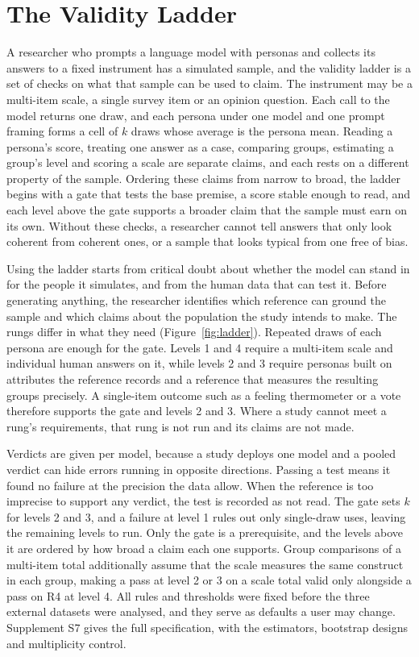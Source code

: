 
\section{The Validity Ladder}
\label{sec:ladder}

A researcher who prompts a language model with personas and collects its answers to a fixed instrument has a simulated sample, and the validity ladder is a set of checks on what that sample can be used to claim.
The instrument may be a multi-item scale, a single survey item or an opinion question.
Each call to the model returns one draw, and each persona under one model and one prompt framing forms a cell of $k$ draws whose average is the persona mean.
Reading a persona's score, treating one answer as a case, comparing groups, estimating a group's level and scoring a scale are separate claims, and each rests on a different property of the sample.
Ordering these claims from narrow to broad, the ladder begins with a gate that tests the base premise, a score stable enough to read, and each level above the gate supports a broader claim that the sample must earn on its own.
Without these checks, a researcher cannot tell answers that only look coherent from coherent ones, or a sample that looks typical from one free of bias.

Using the ladder starts from critical doubt about whether the model can stand in for the people it simulates, and from the human data that can test it.
Before generating anything, the researcher identifies which reference can ground the sample and which claims about the population the study intends to make.
The rungs differ in what they need (Figure~\ref{fig:ladder}).
Repeated draws of each persona are enough for the gate.
Levels 1 and 4 require a multi-item scale and individual human answers on it, while levels 2 and 3 require personas built on attributes the reference records and a reference that measures the resulting groups precisely.
A single-item outcome such as a feeling thermometer or a vote therefore supports the gate and levels 2 and 3.
Where a study cannot meet a rung's requirements, that rung is not run and its claims are not made.

Verdicts are given per model, because a study deploys one model and a pooled verdict can hide errors running in opposite directions.
Passing a test means it found no failure at the precision the data allow.
When the reference is too imprecise to support any verdict, the test is recorded as not read.
The gate sets $k$ for levels 2 and 3, and a failure at level 1 rules out only single-draw uses, leaving the remaining levels to run.
Only the gate is a prerequisite, and the levels above it are ordered by how broad a claim each one supports.
Group comparisons of a multi-item total additionally assume that the scale measures the same construct in each group, making a pass at level 2 or 3 on a scale total valid only alongside a pass on R4 at level 4.
All rules and thresholds were fixed before the three external datasets were analysed, and they serve as defaults a user may change.
Supplement S7 gives the full specification, with the estimators, bootstrap designs and multiplicity control.

